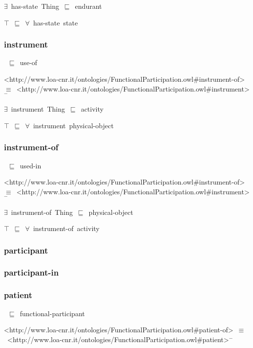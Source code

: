 \documentclass{article}
\begin{document}
\ensuremath{\exists}~has-state~Thing~\ensuremath{\sqsubseteq}~endurant

\ensuremath{\top}~\ensuremath{\sqsubseteq}~\ensuremath{\forall}~has-state~state

\subsubsection*{instrument}

~\ensuremath{\sqsubseteq}~use-of

<http://www.loa-cnr.it/ontologies/FunctionalParticipation.owl#instrument-of>~\ensuremath{\equiv}~<http://www.loa-cnr.it/ontologies/FunctionalParticipation.owl#instrument>\ensuremath{^-}

\ensuremath{\exists}~instrument~Thing~\ensuremath{\sqsubseteq}~activity

\ensuremath{\top}~\ensuremath{\sqsubseteq}~\ensuremath{\forall}~instrument~physical-object

\subsubsection*{instrument-of}

~\ensuremath{\sqsubseteq}~used-in

<http://www.loa-cnr.it/ontologies/FunctionalParticipation.owl#instrument-of>~\ensuremath{\equiv}~<http://www.loa-cnr.it/ontologies/FunctionalParticipation.owl#instrument>\ensuremath{^-}

\ensuremath{\exists}~instrument-of~Thing~\ensuremath{\sqsubseteq}~physical-object

\ensuremath{\top}~\ensuremath{\sqsubseteq}~\ensuremath{\forall}~instrument-of~activity

\subsubsection*{participant}

\subsubsection*{participant-in}

\subsubsection*{patient}

~\ensuremath{\sqsubseteq}~functional-participant

<http://www.loa-cnr.it/ontologies/FunctionalParticipation.owl#patient-of>~\ensuremath{\equiv}~<http://www.loa-cnr.it/ontologies/FunctionalParticipation.owl#patient>\ensuremath{^-}
\end{document}
